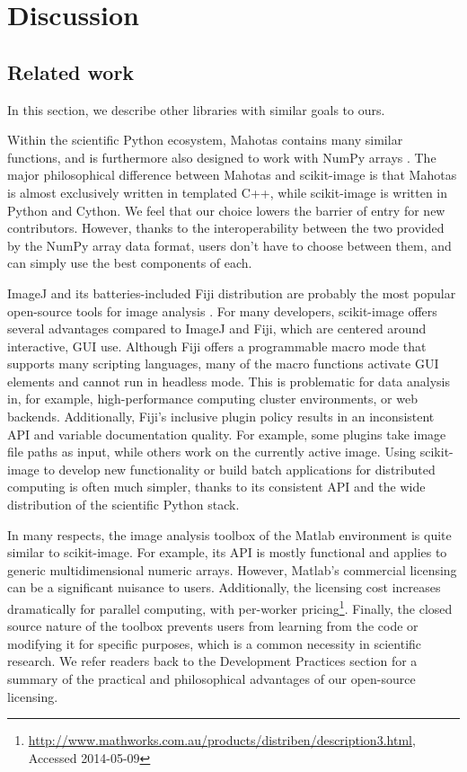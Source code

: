 
\section*{Discussion}
  \label{sec:discussion}

  \subsection*{Related work}

  In this section, we describe other libraries with similar goals to ours.
  
  Within the scientific Python ecosystem, Mahotas contains many similar
  functions, and is furthermore also designed to work with NumPy arrays
  \citep{Mahotas}. The major philosophical difference between Mahotas and
  scikit-image is that Mahotas is almost exclusively written in templated C++,
  while scikit-image is written in Python and Cython. We feel that our choice
  lowers the barrier of entry for new contributors. However,
  thanks to the interoperability between the two provided by the NumPy array
  data format, users don't have to choose between them, and can simply use the
  best components of each.

  ImageJ and its batteries-included Fiji distribution are probably the most
  popular open-source tools for image analysis \citep{imagej,Fiji}. For many
  developers, scikit-image offers several advantages compared to ImageJ and 
  Fiji, which are centered around interactive, GUI use. Although Fiji offers a
  programmable macro mode that supports many scripting languages, many of the
  macro functions activate GUI elements and cannot run in headless mode. This
  is problematic for data analysis in, for example, high-performance computing
  cluster environments, or web backends. Additionally, Fiji's inclusive plugin
  policy results in an inconsistent API and variable documentation quality. For example,
  some plugins take image file paths as input, while others work on the
  currently active image. Using scikit-image to develop new functionality or
  build batch applications for distributed computing is often much simpler,
  thanks to its consistent API and the wide distribution of the scientific
  Python stack.

  In many respects, the image analysis toolbox of the Matlab environment is
  quite similar to scikit-image. For example, its API is mostly functional and
  applies to generic multidimensional numeric arrays. However, Matlab's
  commercial licensing can be a significant nuisance to users. Additionally,
  the licensing cost increases dramatically for parallel computing, with
  per-worker pricing\footnote{\url{http://www.mathworks.com.au/products/distriben/description3.html}, Accessed 2014-05-09}.
  Finally, the closed source nature of the toolbox prevents users from
  learning from the code or modifying it for specific purposes, which is a
  common necessity in scientific research. We refer readers back to the
  Development Practices section for a summary of the practical and
  philosophical advantages of our open-source licensing.

